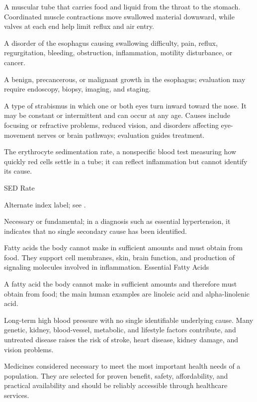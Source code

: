  A muscular tube that carries food and liquid from the throat to the stomach. Coordinated muscle contractions move swallowed material downward, while valves at each end help limit reflux and air entry.

 A disorder of the esophagus causing swallowing difficulty, pain, reflux, regurgitation, bleeding, obstruction, inflammation, motility disturbance, or cancer.

 A benign, precancerous, or malignant growth in the esophagus; evaluation may require endoscopy, biopsy, imaging, and staging.

 A type of strabismus in which one or both eyes turn inward toward the nose. It may be constant or intermittent and can occur at any age. Causes include focusing or refractive problems, reduced vision, and disorders affecting eye-movement nerves or brain pathways; evaluation guides treatment.

 The erythrocyte sedimentation rate, a nonspecific blood test measuring how quickly red cells settle in a tube; it can reflect inflammation but cannot identify its cause.

\synonyms
SED Rate

 Alternate index label; see .

 Necessary or fundamental; in a diagnosis such as essential hypertension, it indicates that no single secondary cause has been identified.

 Fatty acids the body cannot make in sufficient amounts and must obtain from food. They support cell membranes, skin, brain function, and production of signaling molecules involved in inflammation.
\synonyms
Essential Fatty Acids

 A fatty acid the body cannot make in sufficient amounts and therefore must obtain from food; the main human examples are linoleic acid and alpha-linolenic acid.

 Long-term high blood pressure with no single identifiable underlying cause. Many genetic, kidney, blood-vessel, metabolic, and lifestyle factors contribute, and untreated disease raises the risk of stroke, heart disease, kidney damage, and vision problems.

 Medicines considered necessary to meet the most important health needs of a population. They are selected for proven benefit, safety, affordability, and practical availability and should be reliably accessible through healthcare services.

